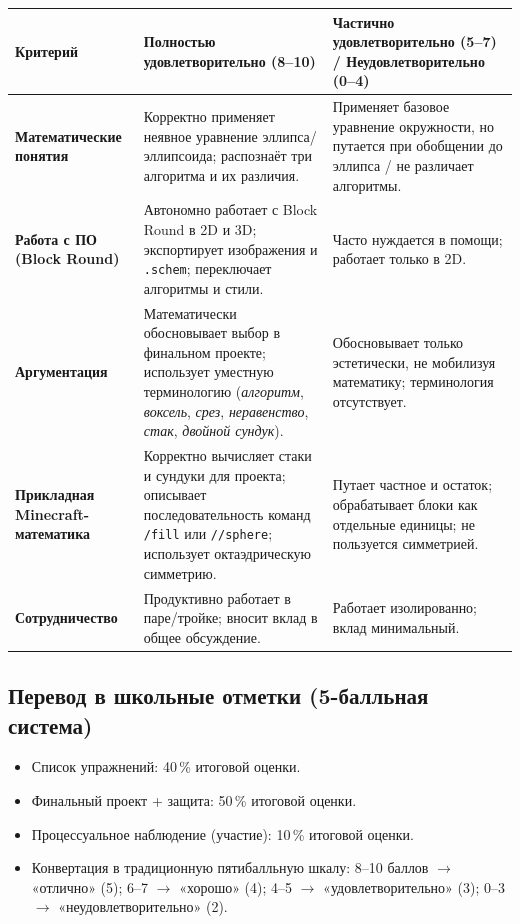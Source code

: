 \documentclass[12pt,a4paper]{scrartcl}
\newcommand{\cmd}[1]{\textcolor{earth}{\texttt{\small #1}}}
\begin{document}
\begin{center}
\small
\begin{tabularx}{\textwidth}{@{}p{}XX@{}}
\toprule
\textbf{Критерий} & \textbf{Полностью удовлетворительно (8--10)} & \textbf{Частично удовлетворительно (5--7) / Неудовлетворительно (0--4)} \\
\midrule
\textbf{Математические понятия} & Корректно применяет неявное уравнение эллипса/эллипсоида; распознаёт три алгоритма и их различия. & Применяет базовое уравнение окружности, но путается при обобщении до эллипса / не различает алгоритмы. \\
\addlinespace[3pt]
\textbf{Работа с ПО (Block Round)} & Автономно работает с Block Round в 2D и 3D; экспортирует изображения и \texttt{.schem}; переключает алгоритмы и стили. & Часто нуждается в помощи; работает только в 2D. \\
\addlinespace[3pt]
\textbf{Аргументация} & Математически обосновывает выбор в финальном проекте; использует уместную терминологию (\emph{алгоритм}, \emph{воксель}, \emph{срез}, \emph{неравенство}, \emph{стак}, \emph{двойной сундук}). & Обосновывает только эстетически, не мобилизуя математику; терминология отсутствует. \\
\addlinespace[3pt]
\textbf{Прикладная Minecraft-математика} & Корректно вычисляет стаки и сундуки для проекта; описывает последовательность команд \cmd{/fill} или \cmd{//sphere}; использует октаэдрическую симметрию. & Путает частное и остаток; обрабатывает блоки как отдельные единицы; не пользуется симметрией. \\
\addlinespace[3pt]
\textbf{Сотрудничество} & Продуктивно работает в паре/тройке; вносит вклад в общее обсуждение. & Работает изолированно; вклад минимальный. \\
\bottomrule
\end{tabularx}
\end{center}

\subsection{Перевод в школьные отметки (5-балльная система)}
\begin{itemize}[leftmargin=1.3em,itemsep=0.1em,topsep=0.2em,nosep]
  \item Список упражнений: 40\,\% итоговой оценки.
  \item Финальный проект + защита: 50\,\% итоговой оценки.
  \item Процессуальное наблюдение (участие): 10\,\% итоговой оценки.
  \item Конвертация в традиционную пятибалльную шкалу: 8--10 баллов $\rightarrow$ «отлично» (5); 6--7 $\rightarrow$ «хорошо» (4); 4--5 $\rightarrow$ «удовлетворительно» (3); 0--3 $\rightarrow$ «неудовлетворительно» (2).
\end{itemize}
\end{document}
